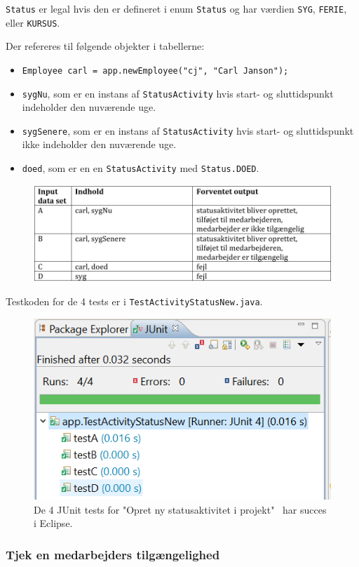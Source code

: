 \texttt{Status} er legal hvis den er defineret i enum \texttt{Status} og har værdien \texttt{SYG}, \texttt{FERIE}, eller \texttt{KURSUS}.

Der refereres til følgende objekter i tabellerne:
\begin{itemize}
\item \texttt{Employee carl = app.newEmployee("cj", "Carl Janson");} 
\item \texttt{sygNu}, som er en instans af \texttt{StatusActivity} hvis start- og sluttidspunkt indeholder den nuværende uge.
\item \texttt{sygSenere}, som er en instans af \texttt{StatusActivity} hvis start- og sluttidspunkt ikke indeholder den nuværende uge.
\item \texttt{doed}, som er en en \texttt{StatusActivity} med \texttt{Status.DOED}. 
\end{itemize}


\begin{figure}[H]
    \centering
    \includegraphics[width = \textwidth]{Figurer/whitebox3b.PNG}
    \label{fig:whitebox3b}
\end{figure}

Testkoden for de 4 tests er i  \texttt{TestActivityStatusNew.java}.

\begin{figure}[H]
    \centering
    \includegraphics[width = 0.5 \textwidth]{Figurer/whitebox3succes.PNG}
    \caption{De 4 JUnit tests for "Opret ny statusaktivitet i projekt" $\,$ har succes i Eclipse.}
    \label{fig:whitebox3succes}
\end{figure}


\subsubsection{Tjek en medarbejders tilgængelighed}

